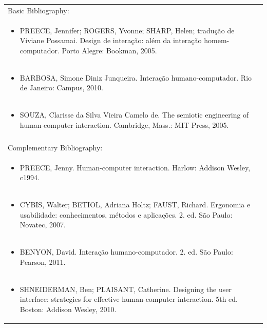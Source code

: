 \documentclass[11pt]{article}
\begin{document}
\begin{center}
\begin{longtable}{|p{4cm}|p{4cm}|p{4cm}|p{4cm}|}
\multicolumn{4}{|p{16cm}|}{Basic Bibliography:}\\*
\multicolumn{4}{|p{\dimexpr 16cm + 6\tabcolsep\relax}|}{\begin{itemize}\item PREECE, Jennifer; ROGERS, Yvonne; SHARP, Helen; tradução de Viviane Possamai. Design de interação: além da interação homem-computador. Porto Alegre: Bookman, 2005.\end{itemize}}\\
\multicolumn{4}{|p{\dimexpr 16cm + 6\tabcolsep\relax}|}{\begin{itemize}\item BARBOSA, Simone Diniz Junqueira. Interação humano-computador. Rio de Janeiro: Campus, 2010.\end{itemize}}\\
\multicolumn{4}{|p{\dimexpr 16cm + 6\tabcolsep\relax}|}{\begin{itemize}\item SOUZA, Clarisse da Silva Vieira Camelo de. The semiotic engineering of human-computer interaction. Cambridge, Mass.: MIT Press, 2005.\end{itemize}}\\
\multicolumn{4}{|p{16cm}|}{}\\
\hline
\multicolumn{4}{|p{16cm}|}{Complementary Bibliography:}\\*
\multicolumn{4}{|p{\dimexpr 16cm + 6\tabcolsep\relax}|}{\begin{itemize}\item PREECE, Jenny. Human-computer interaction. Harlow: Addison Wesley, c1994.\end{itemize}}\\
\multicolumn{4}{|p{\dimexpr 16cm + 6\tabcolsep\relax}|}{\begin{itemize}\item CYBIS, Walter; BETIOL, Adriana Holtz; FAUST, Richard. Ergonomia e usabilidade: conhecimentos, métodos e aplicações. 2. ed. São Paulo: Novatec, 2007.\end{itemize}}\\
\multicolumn{4}{|p{\dimexpr 16cm + 6\tabcolsep\relax}|}{\begin{itemize}\item BENYON, David. Interação humano-computador. 2. ed. São Paulo: Pearson, 2011.\end{itemize}}\\
\multicolumn{4}{|p{\dimexpr 16cm + 6\tabcolsep\relax}|}{\begin{itemize}\item SHNEIDERMAN, Ben; PLAISANT, Catherine. Designing the user interface: strategies for effective human-computer interaction. 5th ed. Boston: Addison Wesley, 2010.\end{itemize}}\\

\end{longtable}
\end{center}
\end{document}
